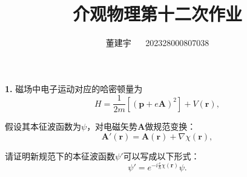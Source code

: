 \documentclass[reqno,a4paper,12pt]{amsart}
\title{介观物理第十二次作业}
\author{董建宇 ~~ 202328000807038}
\begin{document}
\maketitle

\textbf{1.} 磁场中电子运动对应的哈密顿量为
\[
	H = \frac{1}{2m} \left[ (\mathbf{p} + e\mathbf{A})^2 \right] + V(\mathbf{r}),
\]

假设其本征波函数为$\psi$，对电磁矢势$\mathbf{A}$做规范变换：
\[
	\mathbf{A}'(\mathbf{r}) = \mathbf{A}(\mathbf{r}) + \nabla \chi(\mathbf{r}),
\]

请证明新规范下的本征波函数$\psi'$可以写成以下形式：
\[
	\psi' = e^{-i\frac{e}{\hbar}\chi(\mathbf{r})} \psi.
\]
\end{document}
